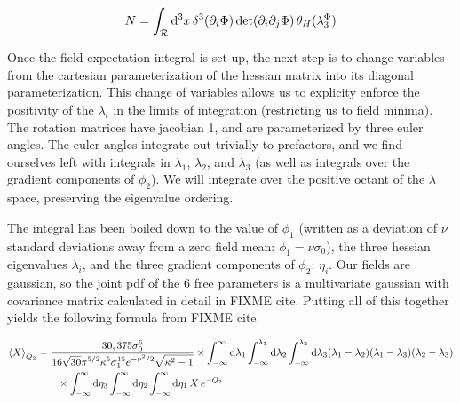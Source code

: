 \documentclass[10pt,letterpaper]{article}
\def\d{{\rm d}}  %
\def\expect#1{\left\langle #1 \right\rangle} %
\def\intinf{\int_{-\infty}^{\infty}}
\begin{document}
\begin{equation}\label{eq:stationary_schematic}
N = \int_{\cal R} \d^3 x \, \delta^3 (\partial_i \Phi ) \det
     (\partial_i \partial_j \Phi ) \, \theta_H(\lambda_3^\Phi)
\end{equation}



\par Once the field-expectation integral is set up, the next step is to change variables from the cartesian parameterization of the hessian matrix into its diagonal parameterization. This change of variables allows us to explicity enforce the positivity of the $\lambda_i$ in the limits of integration (restricting us to field minima). The rotation matrices have jacobian 1, and are parameterized by three euler angles. The euler angles integrate out trivially to prefactors, and we find ourselves left with integrals in $\lambda_1$, $\lambda_2$, and $\lambda_3$ (as well as integrals over the gradient components of $\phi_2$). We will integrate over the positive octant of the $\lambda$ space, preserving the eigenvalue ordering.
\par The integral has been boiled down to the value of $\phi_1$ (written as a deviation of $\nu$ standard deviations away from a zero field mean: $\phi_1 = \nu \sigma_0$), the three hessian eigenvalues $\lambda_i$, and the three gradient components of $\phi_2$: $\eta_i$. Our fields are gaussian, so the joint pdf of the 6 free parameters is a multivariate gaussian with covariance matrix calculated in detail in FIXME cite. Putting all of this together yields the following formula from FIXME cite.

\begin{gather} \label{eq:allspace_integral}
\begin{split}
\expect{X}_{Q_2} &= \frac{\displaystyle 30,375 \sigma_0^6}{\displaystyle 16 \sqrt{30} \pi^{5/2} \kappa^5 \sigma_1^{15}e^{-\nu^2/2} \sqrt{\kappa^2-1}} \times \int_{-\infty}^{\infty} \d \lambda_1 
     \int_{-\infty}^{\lambda_1} \d \lambda_2 
     \int_{-\infty}^{\lambda_2} \d \lambda_3 (\lambda_1 -
     \lambda_2) (\lambda_1 - \lambda_3) (\lambda_2 - \lambda_3) \\
     &\qquad \times \intinf \d \eta_{3} 
     \intinf \d \eta_{2} 
     \intinf \d \eta_{1} \,  X \, e^{- Q_2} \nonumber
\end{split}
\end{gather}
\end{document}
